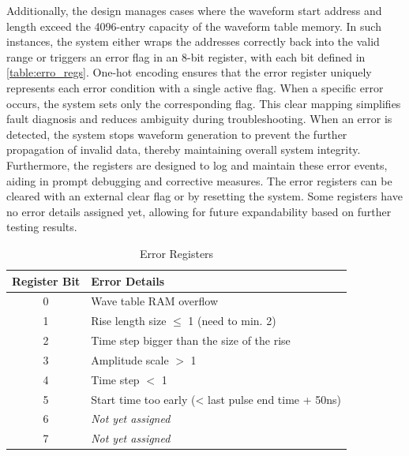 Additionally, the design manages cases where the waveform start address and length exceed the 4096-entry capacity of the waveform table memory. In such instances, the system either wraps the addresses correctly back into the valid range or triggers an error flag in an 8-bit register, with each bit defined in \autoref{table:erro_regs}. One-hot encoding ensures that the error register uniquely represents each error condition with a single active flag. When a specific error occurs, the system sets only the corresponding flag. This clear mapping simplifies fault diagnosis and reduces ambiguity during troubleshooting. When an error is detected, the system stops waveform generation to prevent the further propagation of invalid data, thereby maintaining overall system integrity. Furthermore, the registers are designed to log and maintain these error events, aiding in prompt debugging and corrective measures. The error registers can be cleared with an external clear flag or by resetting the system. Some registers have no error details assigned yet, allowing for future expandability based on further testing results.
\begin{table}[h]
\setlength{\abovecaptionskip}{5pt}    %
\setlength{\belowcaptionskip}{5pt}    %
\centering
\caption{Error Registers}
\label{table:erro_regs}
\begin{tabular}{|c|l|}
\hline
Register Bit & Error Details \\
\hline
0 & Wave table RAM overflow \\
\hline
1 & Rise length size $\leq$ 1 (need to min. 2) \\
\hline
2 & Time step bigger than the size of the rise \\
\hline
3 & Amplitude scale $>$ 1 \\
\hline
4 & Time step $<$ 1 \\
\hline
5 & Start time too early (< last pulse end time + 50ns) \\
\hline
6 & \textit{Not yet assigned} \\
\hline
7 & \textit{Not yet assigned} \\
\hline
\end{tabular}
\end{table}